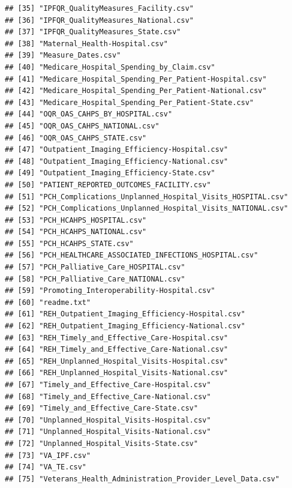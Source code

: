 \documentclass[
]{article}
\begin{document}
\begin{verbatim}
## [35] "IPFQR_QualityMeasures_Facility.csv"                              
## [36] "IPFQR_QualityMeasures_National.csv"                              
## [37] "IPFQR_QualityMeasures_State.csv"                                 
## [38] "Maternal_Health-Hospital.csv"                                    
## [39] "Measure_Dates.csv"                                               
## [40] "Medicare_Hospital_Spending_by_Claim.csv"                         
## [41] "Medicare_Hospital_Spending_Per_Patient-Hospital.csv"             
## [42] "Medicare_Hospital_Spending_Per_Patient-National.csv"             
## [43] "Medicare_Hospital_Spending_Per_Patient-State.csv"                
## [44] "OQR_OAS_CAHPS_BY_HOSPITAL.csv"                                   
## [45] "OQR_OAS_CAHPS_NATIONAL.csv"                                      
## [46] "OQR_OAS_CAHPS_STATE.csv"                                         
## [47] "Outpatient_Imaging_Efficiency-Hospital.csv"                      
## [48] "Outpatient_Imaging_Efficiency-National.csv"                      
## [49] "Outpatient_Imaging_Efficiency-State.csv"                         
## [50] "PATIENT_REPORTED_OUTCOMES_FACILITY.csv"                          
## [51] "PCH_Complications_Unplanned_Hospital_Visits_HOSPITAL.csv"        
## [52] "PCH_Complications_Unplanned_Hospital_Visits_NATIONAL.csv"        
## [53] "PCH_HCAHPS_HOSPITAL.csv"                                         
## [54] "PCH_HCAHPS_NATIONAL.csv"                                         
## [55] "PCH_HCAHPS_STATE.csv"                                            
## [56] "PCH_HEALTHCARE_ASSOCIATED_INFECTIONS_HOSPITAL.csv"               
## [57] "PCH_Palliative_Care_HOSPITAL.csv"                                
## [58] "PCH_Palliative_Care_NATIONAL.csv"                                
## [59] "Promoting_Interoperability-Hospital.csv"                         
## [60] "readme.txt"                                                      
## [61] "REH_Outpatient_Imaging_Efficiency-Hospital.csv"                  
## [62] "REH_Outpatient_Imaging_Efficiency-National.csv"                  
## [63] "REH_Timely_and_Effective_Care-Hospital.csv"                      
## [64] "REH_Timely_and_Effective_Care-National.csv"                      
## [65] "REH_Unplanned_Hospital_Visits-Hospital.csv"                      
## [66] "REH_Unplanned_Hospital_Visits-National.csv"                      
## [67] "Timely_and_Effective_Care-Hospital.csv"                          
## [68] "Timely_and_Effective_Care-National.csv"                          
## [69] "Timely_and_Effective_Care-State.csv"                             
## [70] "Unplanned_Hospital_Visits-Hospital.csv"                          
## [71] "Unplanned_Hospital_Visits-National.csv"                          
## [72] "Unplanned_Hospital_Visits-State.csv"                             
## [73] "VA_IPF.csv"                                                      
## [74] "VA_TE.csv"                                                       
## [75] "Veterans_Health_Administration_Provider_Level_Data.csv"
\end{verbatim}
\end{document}
